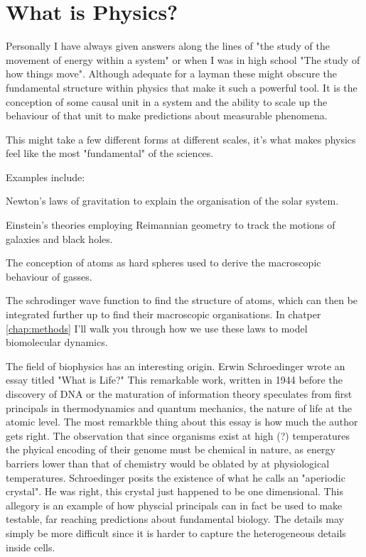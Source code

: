 \section{What is Physics?}
Personally I have always given answers along the lines of "the study of the movement of energy within a system" or when I was in high school "The study of how things move". Although adequate for a layman these might obscure the fundamental structure within physics that make it such a powerful tool. It is the conception of some causal unit in a system and the ability to scale up the behaviour of that unit to make predictions about measurable phenomena.

This might take a few different forms at different scales, it's what makes physics feel like the most "fundamental" of the sciences. 

Examples include:

Newton's laws of gravitation to explain the organisation of the solar system. 

Einstein's theories employing Reimannian geometry to track the motions of galaxies and black holes.

The conception of atoms as hard spheres used to derive the macroscopic behaviour of gasses.

The schrodinger wave function to find the structure of atoms, which can then be integrated further up to find their macroscopic organisations. In chatper \ref{chap:methods} I'll walk you through how we use these laws to model biomolecular dynamics.  

The field of biophysics has an interesting origin. Erwin Schroedinger wrote an essay titled "What is Life?" This remarkable work, written in  1944 before the discovery of DNA or the maturation of information theory speculates from first principals in thermodynamics and quantum mechanics, the nature of life at the atomic level. The most remarkble thing about this essay is how much the author gets right. The observation that since organisms exist at high (?) temperatures the phyical encoding of their genome must be chemical in nature, as energy barriers lower than that of chemistry would be oblated by at physiological temperatures. Schroedinger posits the existence of what he  calls an "aperiodic crystal". He was right, this crystal just happened to be one dimensional. This allegory is an example of how physcial principals can in fact be used to make testable, far reaching predictions about fundamental biology. The details may simply be more difficult since it is harder to capture the heterogeneous details inside cells.

